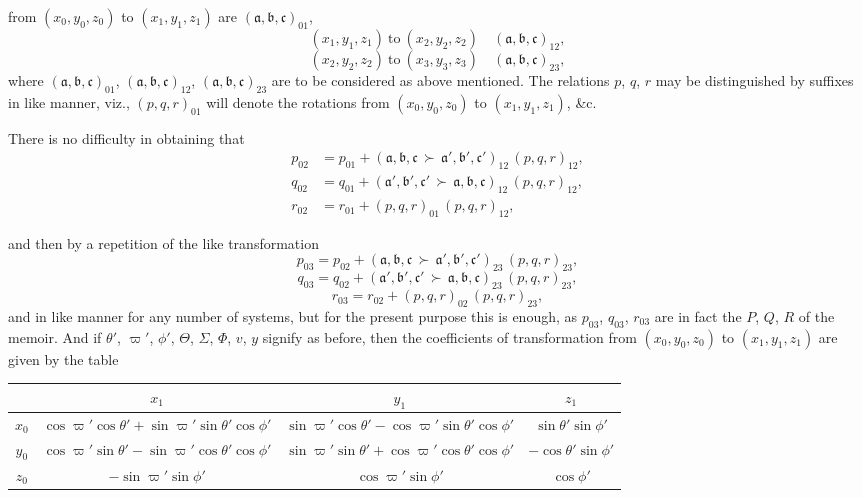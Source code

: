 \documentclass[12pt,a4paper]{article}
\providecommand{\Yright}{\,{\succ}\,}
\theoremstyle{plain}
\begin{document}
\medskip
\noindent from $(x_{0},y_{0},z_{0})$ to $(x_{1},y_{1},z_{1})$ are $(\mathfrak{a},\mathfrak{b},\mathfrak{c})_{01}$,
\[
(x_{1},y_{1},z_{1})\ \text{to}\ (x_{2},y_{2},z_{2})\quad (\mathfrak{a},\mathfrak{b},\mathfrak{c})_{12},
\]
\[
(x_{2},y_{2},z_{2})\ \text{to}\ (x_{3},y_{3},z_{3})\quad (\mathfrak{a},\mathfrak{b},\mathfrak{c})_{23},
\]
where $(\mathfrak{a},\mathfrak{b},\mathfrak{c})_{01}$, $(\mathfrak{a},\mathfrak{b},\mathfrak{c})_{12}$, $(\mathfrak{a},\mathfrak{b},\mathfrak{c})_{23}$ are to be considered as above mentioned. The relations $p$, $q$, $r$ may be distinguished by suffixes in like manner, viz., $(p,q,r)_{01}$ will denote the rotations from $(x_{0},y_{0},z_{0})$ to $(x_{1},y_{1},z_{1})$, \&c.

\medskip
There is no difficulty in obtaining that
\begin{align*}
p_{02} &= p_{01}+(\mathfrak{a},\mathfrak{b},\mathfrak{c}\Yright \mathfrak{a}',\mathfrak{b}',\mathfrak{c}')_{12}\,(p,q,r)_{12},\\
q_{02} &= q_{01}+(\mathfrak{a}',\mathfrak{b}',\mathfrak{c}'\Yright \mathfrak{a},\mathfrak{b},\mathfrak{c})_{12}\,(p,q,r)_{12},\\
r_{02} &= r_{01}+(p,q,r)_{01}\,(p,q,r)_{12},
\end{align*}

\newpage
{} and then by a repetition of the like transformation
\[
p_{03} = p_{02}+(\mathfrak{a},\mathfrak{b},\mathfrak{c}\Yright \mathfrak{a}',\mathfrak{b}',\mathfrak{c}')_{23}\,(p,q,r)_{23},
\]
\[
q_{03} = q_{02}+(\mathfrak{a}',\mathfrak{b}',\mathfrak{c}'\Yright \mathfrak{a},\mathfrak{b},\mathfrak{c})_{23}\,(p,q,r)_{23},
\]
\[
r_{03} = r_{02}+(p,q,r)_{02}\,(p,q,r)_{23},
\]
and in like manner for any number of systems, but for the present purpose this is enough, as $p_{03}$, $q_{03}$, $r_{03}$ are in fact the $P$, $Q$, $R$ of the memoir. And if $\theta'$, $\varpi'$, $\phi'$, $\Theta$, $\varSigma$, $\varPhi$, $v$, $y$ signify as before, then the coefficients of transformation from $(x_{0},y_{0},z_{0})$ to $(x_{1},y_{1},z_{1})$ are given by the table

\begin{center}
\small
\begin{tabular}{|c|c|c|c|}
\hline
       & $x_{1}$ & $y_{1}$ & $z_{1}$ \\
\hline
$x_{0}$ & $\cos\varpi'\cos\theta'+\sin\varpi'\sin\theta'\cos\phi'$ & $\sin\varpi'\cos\theta'-\cos\varpi'\sin\theta'\cos\phi'$ & $\sin\theta'\sin\phi'$ \\
$y_{0}$ & $\cos\varpi'\sin\theta'-\sin\varpi'\cos\theta'\cos\phi'$ & $\sin\varpi'\sin\theta'+\cos\varpi'\cos\theta'\cos\phi'$ & $-\cos\theta'\sin\phi'$ \\
$z_{0}$ & $-\sin\varpi'\sin\phi'$ & $\cos\varpi'\sin\phi'$ & $\cos\phi'$ \\
\hline
\end{tabular}
\end{center}
\end{document}
